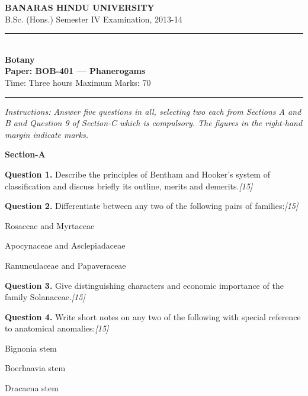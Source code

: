 \documentclass[11pt,a4paper]{article}
\newcommand{\pts}[1]{\hfill   \textit{[#1]}}
\begin{document}
\begin{center}
  {\large\bfseries BANARAS HINDU UNIVERSITY}\\[2pt]
  {\normalsize B.Sc. (Hons.) Semester IV Examination, 2013-14}\\[6pt]
  \rule{0.8\linewidth}{0.5pt}\\[6pt]
  {\large\bfseries Botany}\\[4pt]
  {\large\bfseries Paper: BOB-401 --- Phanerogams}\\[4pt]
  {\normalsize Time: Three hours \hfill Maximum Marks: 70}
\end{center}

\rule{\linewidth}{0.4pt}

\smallskip



\noindent   \textit{Instructions: Answer five questions in all, selecting two each from Sections A and B and Question 9 of Section-C which is compulsory. The figures in the right-hand margin indicate marks.}

\bigskip


\begin{center}
   \textbf{Section-A}
\end{center}
\medskip

\medskip


\noindent   \textbf{Question 1.} Describe the principles of Bentham and Hooker's system of classification and discuss briefly its outline, merits and demerits.\pts{15}

\medskip


\noindent   \textbf{Question 2.} Differentiate between any two of the following pairs of families:\pts{15}

\begin{parts}
  \item Rosaceae and Myrtaceae
  \item Apocynaceae and Asclepiadaceae
  \item Ranunculaceae and Papaveraceae
\end{parts}

\medskip


\noindent   \textbf{Question 3.} Give distinguishing characters and economic importance of the family Solanaceae.\pts{15}

\medskip


\noindent   \textbf{Question 4.} Write short notes on any two of the following with special reference to anatomical anomalies:\pts{15}

\begin{parts}
  \item Bignonia stem
  \item Boerhaavia stem
  \item Dracaena stem
\end{parts}
\end{document}
